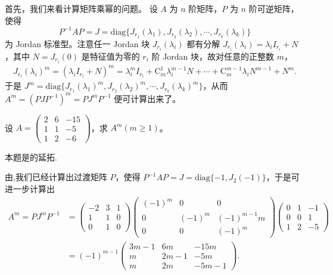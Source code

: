 \documentclass[../../main.tex]{subfiles}
\begin{document}
首先，我们来看计算矩阵乘幂的问题。
设 $A$ 为 $n$ 阶矩阵，$P$ 为 $n$ 阶可逆矩阵，使得 
\[
P^{-1}AP = J = \mathrm{diag}\{J_{r_1}(\lambda_1), J_{r_2}(\lambda_2), \cdots, J_{r_k}(\lambda_k)\}
\] 
为 Jordan 标准型。注意任一 Jordan 块 $J_{r_i}(\lambda_i)$ 都有分解 $J_{r_i}(\lambda_i) = \lambda_i I_{r_i} + N$，其中 $N = J_{r_i}(0)$ 是特征值为零的 $r_i$ 阶 Jordan 块，故对任意的正整数 $m$，
\begin{align*}
J_{r_i}(\lambda_i)^m = (\lambda_i I_{r_i} + N)^m = \lambda_i^m I_{r_i} + \mathrm{C}_m^1 \lambda_i^{m - 1} N + \cdots + \mathrm{C}_m^{m - 1} \lambda_i N^{m - 1} + N^m.
\end{align*}
于是 $J^m = \mathrm{diag}\{J_{r_1}(\lambda_1)^m, J_{r_2}(\lambda_2)^m, \cdots, J_{r_k}(\lambda_k)^m\}$，从而 $A^m = (PJP^{-1})^m = PJ^mP^{-1}$ 便可计算出来了。 

\begin{example}
设 $A = \begin{pmatrix}
2 & 6 & -15 \\
1 & 1 & -5 \\
1 & 2 & -6
\end{pmatrix}$，求 $A^m (m \geqslant  1)$。
\end{example}
\begin{remark}
本题是的延拓.
\end{remark}
\begin{solution}
由,我们已经计算出过渡矩阵 $P$，使得 $P^{-1}AP = J = \mathrm{diag}\{-1, J_2(-1)\}$，于是可进一步计算出
\begin{align*}
A^m = PJ^mP^{-1} &= \begin{pmatrix}
-2 & 3 & 1 \\
1 & 1 & 0 \\
0 & 1 & 0
\end{pmatrix}
\begin{pmatrix}
(-1)^m & 0 & 0 \\
0 & (-1)^m & (-1)^{m - 1}m \\
0 & 0 & (-1)^m
\end{pmatrix}
\begin{pmatrix}
0 & 1 & -1 \\
0 & 0 & 1 \\
1 & 2 & -5
\end{pmatrix}\\
&= (-1)^{m - 1}
\begin{pmatrix}
3m - 1 & 6m & -15m \\
m & 2m - 1 & -5m \\
m & 2m & -5m - 1
\end{pmatrix}. 
\end{align*}

\end{solution}
\end{document}

